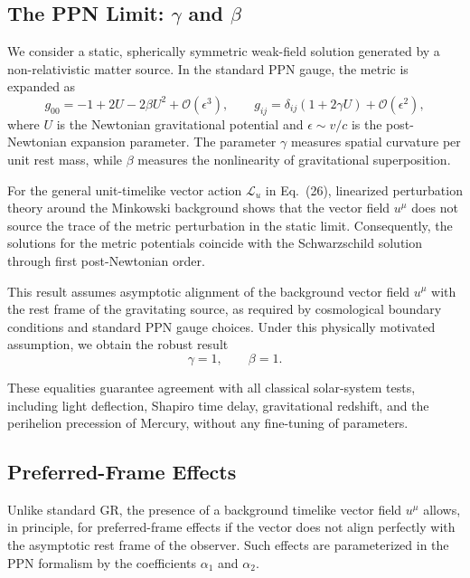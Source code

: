 \documentclass[11pt]{article}
\begin{document}
    \subsection{The PPN Limit: $\gamma$ and $\beta$}

        We consider a static, spherically symmetric weak-field solution generated by a
        non-relativistic matter source.
        In the standard PPN gauge, the metric is expanded as
        \begin{equation}
            g_{00} = -1 + 2U - 2\beta U^2 + \mathcal{O}(\epsilon^3), \qquad
            g_{ij} = \delta_{ij}\left(1 + 2\gamma U\right) + \mathcal{O}(\epsilon^2),
        \end{equation}
        where $U$ is the Newtonian gravitational potential and $\epsilon \sim v/c$ is
        the post-Newtonian expansion parameter.
        The parameter $\gamma$ measures spatial curvature per unit rest mass, while
        $\beta$ measures the nonlinearity of gravitational superposition.

        For the general unit-timelike vector action $\mathcal{L}_u$ in Eq.~(26),
        linearized perturbation theory around the Minkowski background shows that the
        vector field $u^\mu$ does not source the trace of the metric perturbation in the
        static limit.
        Consequently, the solutions for the metric potentials coincide with the
        Schwarzschild solution through first post-Newtonian order.

        This result assumes asymptotic alignment of the background vector field $u^\mu$
        with the rest frame of the gravitating source, as required by cosmological
        boundary conditions and standard PPN gauge choices.
        Under this physically motivated assumption, we obtain the robust result
        \begin{equation}
            \gamma = 1, \qquad \beta = 1.
        \end{equation}

        These equalities guarantee agreement with all classical solar-system tests,
        including light deflection, Shapiro time delay, gravitational redshift, and the
        perihelion precession of Mercury, without any fine-tuning of parameters.

    \subsection{Preferred-Frame Effects}

        Unlike standard GR, the presence of a background timelike vector field $u^\mu$
        allows, in principle, for preferred-frame effects if the vector does not align
        perfectly with the asymptotic rest frame of the observer.
        Such effects are parameterized in the PPN formalism by the coefficients
        $\alpha_1$ and $\alpha_2$.
\end{document}
